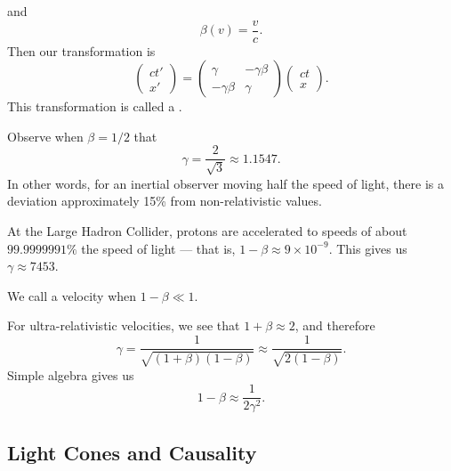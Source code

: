 and
\begin{equation}
\beta(v) = \frac{v}{c}.
\end{equation}
Then our transformation is
\begin{equation}
\begin{pmatrix}ct'\\ x'
\end{pmatrix}
=\begin{pmatrix}\gamma & -\gamma\beta\\
-\gamma\beta & \gamma
\end{pmatrix}
\begin{pmatrix}ct\\ x
\end{pmatrix}.
\end{equation}
This transformation is called a .

\M
Observe when $\beta=1/2$ that
\begin{equation}
\gamma = \frac{2}{\sqrt{3}}\approx 1.1547.
\end{equation}
In other words, for an inertial observer moving half the speed of light,
there is a deviation approximately 15\% from non-relativistic values.

At the Large Hadron Collider, protons are accelerated to speeds of about
$99.9999991\%$ the speed of light --- that is, $1-\beta\approx9\times10^{-9}$.
This gives us $\gamma\approx7453$.

\begin{definition}
We call a velocity  when $1-\beta\ll1$.
\end{definition}

\begin{remark}
For ultra-relativistic velocities, we see that $1+\beta\approx2$, and
therefore
\begin{equation}
\gamma = \frac{1}{\sqrt{(1 + \beta)(1 - \beta)}}
\approx\frac{1}{\sqrt{2(1 - \beta)}}.
\end{equation}
Simple algebra gives us
\begin{equation}
1 - \beta\approx\frac{1}{2\gamma^{2}}.
\end{equation}
\end{remark}
  

\subsection{Light Cones and Causality}

